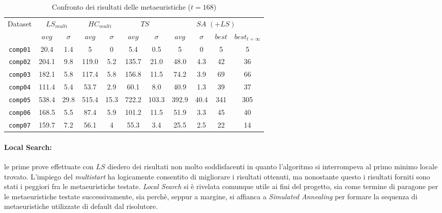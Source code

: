 \documentclass[]{article}
\begin{document}
\begin{table}[h]
	\caption{Confronto dei risultati delle metaeuristiche ($t=168$)}
	\label{tab:intra-results} 
	\footnotesize
	\begin{center}
		\begin{tabular}{| c | c c | c c  | c c |  c c c | c |}
			\hline
			\multirow{2}{*}{Dataset} & 
			\multicolumn{2}{|c|}{$LS_{multi}$} & \multicolumn{2}{c|}{$HC_{multi}$} & \multicolumn{2}{c|}{$TS$}  & \multicolumn{4}{c|}{$SA$ $(+LS)$} \\
			\cline{2-11}
			& $avg$ & $\sigma$ & $avg$ & $\sigma$ & 
			$avg$ & $\sigma$ & $avg$ & $\sigma$ & $best$ & $best_{t=\infty}$ \\
			\hline  
			\texttt{comp01} & 20.4 & 1.4 		&  5 & 0 					& 5.4 & 0.5		 		& 5 & 0 & 5 & 5\\
			\texttt{comp02} & 204.1 & 9.8 		&  119.0 & 5.2		&  135.7 & 21.0 		& 48.0 & 4.3& 42 & 36\\
			\texttt{comp03} &182.1 & 5.8 		&  117.4 & 5.8 			& 156.8 & 11.5 		& 74.2 & 3.9 &69 & 66 \\
			\texttt{comp04} &111.4 & 5.4 		&  53.7 & 2.9 			& 60.1 & 8.0 			& 40.9 & 1.3 &39 & 37\\
			\texttt{comp05} &538.4 & 29.8 		&  515.4 & 15.3		& 722.2 & 103.3 	& 392.9 & 40.4 & 341& 305\\
			\texttt{comp06} &168.5 & 5.5 		&  87.4 & 5.9 			& 101.2 & 11.5 		& 51.9 & 3.3 & 45 & 40\\
			\texttt{comp07} &159.7 & 7.2 		&  56.1 & 4 			& 55.3 & 3.4 		& 25.5 & 2.5 & 22& 14\\
			\hline
		\end{tabular}
	\end{center}
\end{table}


\paragraph{Local Search:} le prime prove effettuate con $LS$ diedero dei risultati non molto soddisfacenti in quanto l'algoritmo si interrompeva al primo minimo locale trovato. L'impiego del \textit{multistart} ha logicamente consentito di migliorare i risultati ottenuti, ma nonostante questo i risultati forniti sono stati i peggiori fra le metaeuristiche testate.  \textit{Local Search} si è rivelata comunque utile ai fini del progetto, sia come termine di paragone per le metaeuristiche testate successivamente, sia perchè, seppur a margine,  si affianca a \textit{Simulated Annealing} per formare la sequenza di metaeuristiche utilizzate di default dal risolutore.
\end{document}
